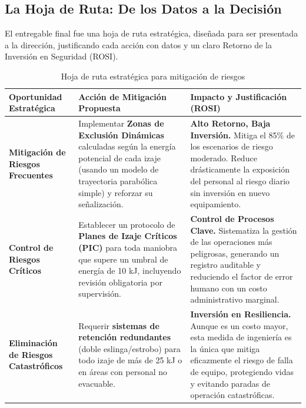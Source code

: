 \documentclass[11pt, a4paper, spanish]{article}
\begin{document}

\subsection*{La Hoja de Ruta: De los Datos a la Decisión}
El entregable final fue una hoja de ruta estratégica, diseñada para ser presentada a la dirección, justificando cada acción con datos y un claro Retorno de la Inversión en Seguridad (ROSI).

\begin{table}[h!]
\centering
\footnotesize
\renewcommand{\arraystretch}{1.5}
\begin{tabularx}{\textwidth}{@{}>{\bfseries}L{3cm} L{4.5cm} L{4.5cm} @{}}
    \toprule
    \textbf{Oportunidad Estratégica} & \textbf{Acción de Mitigación Propuesta} & \textbf{Impacto y Justificación (ROSI)} \\
    \midrule
    Mitigación de Riesgos Frecuentes & Implementar \textbf{Zonas de Exclusión Dinámicas} calculadas según la energía potencial de cada izaje (usando un modelo de trayectoria parabólica simple) y reforzar su señalización. & \textbf{Alto Retorno, Baja Inversión.} Mitiga el 85\% de los escenarios de riesgo moderado. Reduce drásticamente la exposición del personal al riesgo diario sin inversión en nuevo equipamiento. \\
    
    \addlinespace
    Control de Riesgos Críticos & Establecer un protocolo de \textbf{Planes de Izaje Críticos (PIC)} para toda maniobra que supere un umbral de energía de 10 kJ, incluyendo revisión obligatoria por supervisión. & \textbf{Control de Procesos Clave.} Sistematiza la gestión de las operaciones más peligrosas, generando un registro auditable y reduciendo el factor de error humano con un costo administrativo marginal. \\
    
    \addlinespace
    Eliminación de Riesgos Catastróficos & Requerir \textbf{sistemas de retención redundantes} (doble eslinga/estrobo) para todo izaje de más de 25 kJ o en áreas con personal no evacuable. & \textbf{Inversión en Resiliencia.} Aunque es un costo mayor, esta medida de ingeniería es la única que mitiga eficazmente el riesgo de falla de equipo, protegiendo vidas y evitando paradas de operación catastróficas. \\
    \bottomrule
\end{tabularx}
\caption{Hoja de ruta estratégica para mitigación de riesgos}
\end{table}

\end{document}
